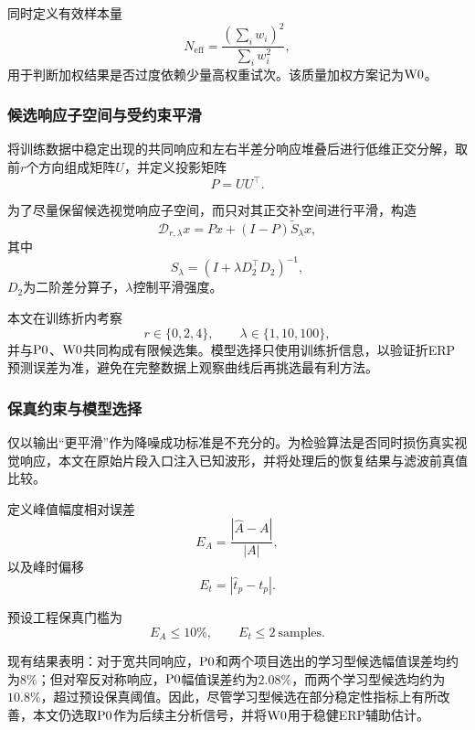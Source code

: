 同时定义有效样本量
\begin{equation}
N_{\mathrm{eff}}
=
\frac{\left(\sum_i w_i\right)^2}
{\sum_i w_i^2},
\label{eq:neff}
\end{equation}
用于判断加权结果是否过度依赖少量高权重试次。该质量加权方案记为$\mathrm{W0}$。

\subsubsection{候选响应子空间与受约束平滑}

将训练数据中稳定出现的共同响应和左右半差分响应堆叠后进行低维正交分解，取前$r$个方向组成矩阵$U$，并定义投影矩阵
\begin{equation}
P=UU^\top.
\end{equation}

为了尽量保留候选视觉响应子空间，而只对其正交补空间进行平滑，构造
\begin{equation}
\mathcal{D}_{r,\lambda}x
=
Px+(I-P)\widetilde S_\lambda x,
\label{eq:subspace_denoise}
\end{equation}
其中
\begin{equation}
S_\lambda=(I+\lambda D_2^\top D_2)^{-1},
\end{equation}
$D_2$为二阶差分算子，$\lambda$控制平滑强度。

本文在训练折内考察
\[
r\in\{0,2,4\},\qquad
\lambda\in\{1,10,100\},
\]
并与$\mathrm{P0}$、$\mathrm{W0}$共同构成有限候选集。模型选择只使用训练折信息，以验证折ERP预测误差为准，避免在完整数据上观察曲线后再挑选最有利方法。

\subsubsection{保真约束与模型选择}

仅以输出“更平滑”作为降噪成功标准是不充分的。为检验算法是否同时损伤真实视觉响应，本文在原始片段入口注入已知波形，并将处理后的恢复结果与滤波前真值比较。

定义峰值幅度相对误差
\begin{equation}
E_A=\frac{|\hat A-A|}{|A|},
\end{equation}
以及峰时偏移
\begin{equation}
E_t=|\hat t_p-t_p|.
\end{equation}

预设工程保真门槛为
\[
E_A\le 10\%,\qquad E_t\le 2\ \text{samples}.
\]

现有结果表明：对于宽共同响应，$\mathrm{P0}$和两个项目选出的学习型候选幅值误差均约为$8\%$；但对窄反对称响应，$\mathrm{P0}$幅值误差约为$2.08\%$，而两个学习型候选均约为$10.8\%$，超过预设保真阈值。因此，尽管学习型候选在部分稳定性指标上有所改善，本文仍选取$\mathrm{P0}$作为后续主分析信号，并将$\mathrm{W0}$用于稳健ERP辅助估计。

